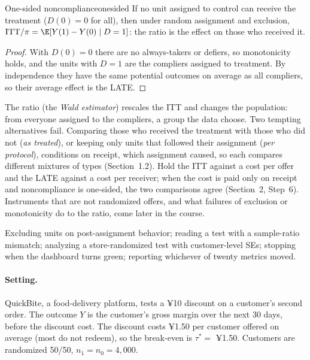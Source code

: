 \documentclass[11pt]{article}
\begin{document}
\begin{prop}{One-sided noncompliance}{onesided}
If no unit assigned to control can receive the treatment ($D(0) = 0$ for all), then under random assignment and
exclusion, $\text{ITT}/\pi = \E[Y(1) - Y(0) \mid D = 1]$: the ratio is the effect on those who received it.
\end{prop}
\begin{proof}
With $D(0) = 0$ there are no always-takers or defiers, so monotonicity holds, and the units with $D = 1$ are the
compliers assigned to treatment. By independence they have the same potential outcomes on average as all
compliers, so their average effect is the LATE.
\end{proof}

The ratio (the \emph{Wald estimator}) rescales the ITT and changes the population: from everyone assigned to the
compliers, a group the data choose. Two tempting alternatives fail. Comparing those who received the treatment
with those who did not (\emph{as treated}), or keeping only units that followed their assignment
(\emph{per protocol}), conditions on receipt, which assignment caused, so each compares different mixtures of
types (Section~1.2). Hold the ITT against a cost per offer and the LATE against a cost per receiver; when the
cost is paid only on receipt and noncompliance is one-sided, the two comparisons agree (Section~2, Step~6).
Instruments that are not randomized offers, and what failures of exclusion or monotonicity do to the ratio, come
later in the course.

\begin{pitfall}
Excluding units on post-assignment behavior; reading a test with a sample-ratio mismatch; analyzing a
store-randomized test with customer-level SEs; stopping when the dashboard turns green; reporting whichever
of twenty metrics moved.
\end{pitfall}


\sectiontwo

\paragraph{Setting.} QuickBite, a food-delivery platform, tests a ¥10 discount on a customer's second order.
The outcome $Y$ is the customer's gross margin over the next 30 days, before the discount cost. The discount
costs ¥1.50 per customer offered on average (most do not redeem), so the break-even is $\tau^\ast = $ ¥1.50.
Customers are randomized 50/50, $n_1 = n_0 = 4{,}000$.
\end{document}
